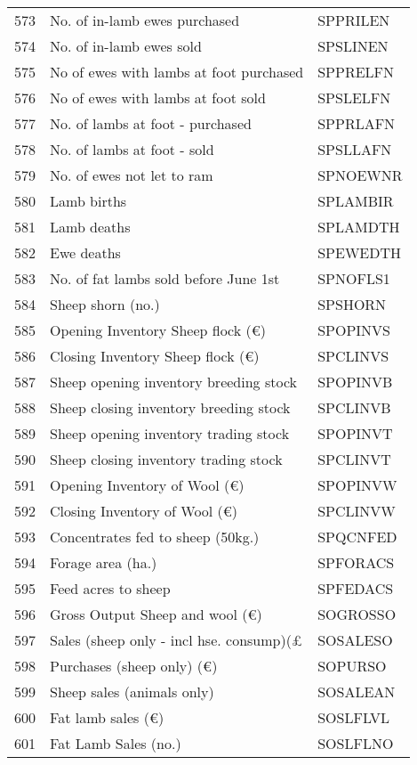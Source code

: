 \documentclass{article}\usepackage{graphicx, color}
\begin{document}
\begin{flushleft}
\begin{table}[ht]
\begin{center}
\begin{tabular}{rll}
  573 & No. of in-lamb ewes purchased & SPPRILEN \\ 
  574 & No. of in-lamb ewes sold & SPSLINEN \\ 
  575 & No of ewes with lambs at foot purchased & SPPRELFN \\ 
  576 & No of ewes with lambs at foot sold & SPSLELFN \\ 
  577 & No. of lambs at foot - purchased & SPPRLAFN \\ 
  578 & No. of lambs at foot - sold & SPSLLAFN \\ 
  579 & No. of ewes not let to ram & SPNOEWNR \\ 
  580 & Lamb births & SPLAMBIR \\ 
  581 & Lamb deaths & SPLAMDTH \\ 
  582 & Ewe deaths & SPEWEDTH \\ 
  583 & No. of fat lambs sold before June 1st & SPNOFLS1 \\ 
  584 & Sheep shorn             (no.) & SPSHORN \\ 
  585 & Opening Inventory Sheep flock   (€) & SPOPINVS \\ 
  586 & Closing Inventory Sheep flock   (€) & SPCLINVS \\ 
  587 & Sheep opening inventory breeding stock & SPOPINVB \\ 
  588 & Sheep closing inventory breeding stock & SPCLINVB \\ 
  589 & Sheep opening inventory trading stock & SPOPINVT \\ 
  590 & Sheep closing inventory trading stock & SPCLINVT \\ 
  591 & Opening Inventory of Wool (€) & SPOPINVW \\ 
  592 & Closing Inventory of Wool (€) & SPCLINVW \\ 
  593 & Concentrates fed to sheep (50kg.) & SPQCNFED \\ 
  594 & Forage area (ha.) & SPFORACS \\ 
  595 & Feed acres to sheep & SPFEDACS \\ 
  596 & Gross Output Sheep and wool (€) & SOGROSSO \\ 
  597 & Sales (sheep only - incl hse. consump)(£ & SOSALESO \\ 
  598 & Purchases (sheep only)   (€) & SOPURSO \\ 
  599 & Sheep sales (animals only) & SOSALEAN \\ 
  600 & Fat lamb sales           (€) & SOSLFLVL \\ 
  601 & Fat Lamb Sales           (no.) & SOSLFLNO \\ 

\end{tabular}
\end{center}
\end{table}
\end{flushleft}
\end{document}
